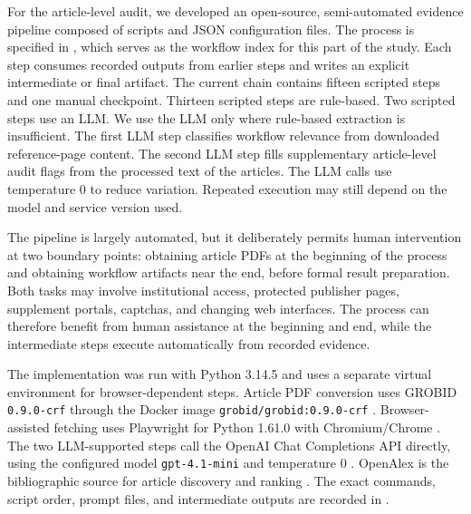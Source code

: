 \documentclass[runningheads]{llncs}
\begin{document}
For the article-level audit, we developed an open-source, semi-automated
evidence pipeline composed of scripts and JSON configuration files. The
process is specified in , which serves as
the workflow index for this part of the study. Each step consumes recorded
outputs from earlier steps and writes an explicit intermediate or final
artifact.
The current chain contains fifteen scripted steps and one manual checkpoint.
Thirteen scripted steps are rule-based. Two scripted steps use an LLM.
We use the LLM only where rule-based extraction is insufficient. The first LLM
step classifies workflow relevance from downloaded reference-page content. The
second LLM step fills supplementary article-level audit flags from the
processed text of the articles. The LLM calls use temperature 0 to reduce
variation. Repeated execution may still depend on the model and service version
used.

The pipeline is largely automated, but it deliberately permits human
intervention at two boundary points: obtaining article PDFs at the beginning
of the process and obtaining workflow artifacts near the end, before formal
result preparation.
Both tasks may involve institutional access, protected publisher pages,
supplement portals, captchas, and changing web interfaces. The process can
therefore benefit from human assistance at the beginning and end, while the
intermediate steps execute automatically from recorded evidence.

The implementation was run with Python 3.14.5 and uses a separate
 virtual environment for browser-dependent steps.
Article PDF conversion uses GROBID \texttt{0.9.0-crf} through the Docker image
\texttt{grobid/grobid:0.9.0-crf} \cite{GROBIDSoftware2026}. Browser-assisted
fetching uses Playwright for Python 1.61.0 with Chromium/Chrome
\cite{PlaywrightPython2026}. The two LLM-supported steps call the OpenAI Chat
Completions API directly, using the configured model
\texttt{gpt-4.1-mini} and temperature 0 \cite{OpenAIAPI2026}. OpenAlex is the
bibliographic source for article discovery and ranking
\cite{Priem2022OpenAlex}. The exact commands, script order, prompt files, and
intermediate outputs are recorded in .
\end{document}
